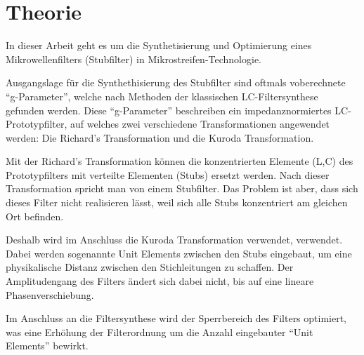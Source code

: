 \section{Theorie}


In  dieser  Arbeit  geht  es  um die  Synthetisierung  und  Optimierung  eines
Mikrowellenfilters (Stubfilter) in Mikrostreifen-Technologie.

Ausgangslage  für  die  Synthethisierung  des  Stubfilter  sind oftmals voberechnete
``g-Parameter'',  welche  nach  Methoden  der   klassischen  LC-Filtersynthese
gefunden  werden.  Diese  ``g-Parameter'' beschreiben  ein  impedanznormiertes
LC-Prototypfilter, auf    welches    zwei    verschiedene   Transformationen
angewendet werden: Die Richard's Transformation und die Kuroda Transformation.

Mit der Richard's Transformation können  die konzentrierten Elemente (L,C) des
Prototypfilters mit verteilte  Elementen  (Stubs)  ersetzt werden. Nach dieser
Transformation  spricht  man  von einem Stubfilter. Das Problem ist aber, dass
sich dieses Filter nicht realisieren lässt,  weil sich alle Stubs konzentriert
am gleichen Ort befinden.

Deshalb  wird  im  Anschluss  die Kuroda Transformation verwendet,  verwendet.
Dabei  werden sogenannte Unit Elements zwischen den Stubs eingebaut,  um  eine
physikalische   Distanz  zwischen  den   Stichleitungen   zu   schaffen.   Der
Amplitudengang  des  Filters ändert sich dabei nicht,  bis  auf  eine  lineare
Phasenverschiebung.

Im  Anschluss  an   die  Filtersynthese  wird  der  Sperrbereich  des  Filters
optimiert,  was  eine  Erhöhung  der Filterordnung um die  Anzahl  eingebauter
``Unit  Elements'' bewirkt.


